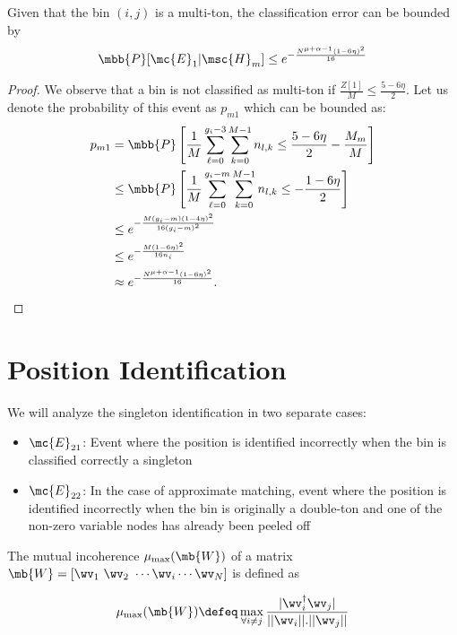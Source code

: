 \begin{lemma}
\label{Lem:MultitonClassif}
Given that the bin $(i,j)$ is a multi-ton, the classification error can be bounded by
\begin{align*}
\mbb{P}[\mc{E}_1|\msc{H}_m]\leq e^{-\frac{N^{\mu+\alpha-1}(1-6\eta)^2}{16}}
\end{align*}
\end{lemma}
\begin{proof}
We observe that a bin is not classified as multi-ton if $\frac{Z[1]}{M}\leq\frac{5-6\eta}{2}$. Let us denote the probability of this event as $p_{m1}$ which can be bounded as:
\begin{align*}
p_{m1}&=\mbb{P}\left[\frac{1}{M}\sum\limits_{\ell=0}^{g_{i}-3}\sum\limits_{k=0}^{M-1} n_{l,k}\leq\frac{5-6\eta}{2}-\frac{M_m}{M}\right]\\
&\leq \mbb{P}\left[\frac{1}{M}\sum\limits_{\ell=0}^{g_{i}-m}\sum\limits_{k=0}^{M-1} n_{l,k}\leq-\frac{1-6\eta}{2}\right]\\
&\leq e^{-\frac{M(g_i-m)(1-4\eta)^2}{16(g_i-m)^{2}}}\\
&\leq e^{-\frac{M(1-6\eta)^2}{16 n_i}}\\
 &\approx e^{-\frac{N^{\mu+\alpha-1}(1-6\eta)^2}{16}}.
\end{align*} 
\end{proof}

\section{Position Identification}
\label{Append:PositionIdentif}
We will analyze the singleton identification in two separate cases:
\begin{itemize}
\item $\mc{E}_{21}$: Event where the position is identified incorrectly when the bin is classified  correctly a singleton
\item $\mc{E}_{22}$: In the case of approximate matching, event where the position is identified incorrectly when the bin is originally a double-ton and one of the non-zero variable nodes has already been peeled off
\end{itemize}

\begin{definition}
	The mutual incoherence $\mu_{\text{max}}( \mb{W})$ of a matrix $\mb{W} = [\wv_1 ~ \wv_2 ~ \cdots \wv_i \cdots \wv_N ]$ is defined as 
	
	\[\mu_{\text{max}}(\mb{W}) \defeq \max \limits_{\forall i \neq j} \frac{|\wv_i^{\dagger} \wv_j |}{||\wv_i || . ||\wv_j ||} \]
\end{definition}

